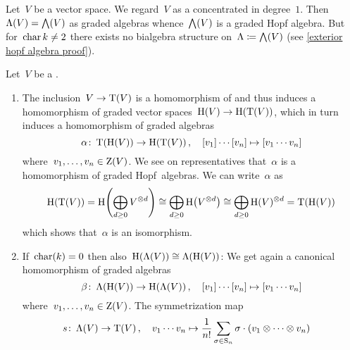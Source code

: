 \documentclass[a4paper,10pt,headings=standardclasses]{scrartcl}
\begin{document}
\begin{example}
  \label{exterior hopf algebra}
  Let~$V$ be a vector space.
  We regard~$V$ as a {\dgv} concentrated in degree~$1$.
  Then~$\operatorname{\Lambda}(V) = \bigwedge(V)$ as graded algebras whence~$\bigwedge(V)$ is a graded Hopf algebra.
  But for~$\operatorname{char} k \neq 2$ there exists no bialgebra structure on~$\Lambda \coloneqq \bigwedge(V)$ (see \cref{exterior hopf algebra proof}).
\end{example}

\begin{example}
  \label{homology of tensor and symmetric}
  Let~$V$ be a {\dgv}.
  \begin{enumerate}
    \item
      The inclusion~$V \to \operatorname{T}(V)$ is a homomorphism of {\dgvs} and thus induces a homomorphism of graded vector spaces~$\operatorname{H}(V) \to \operatorname{H}(\operatorname{T}(V))$, which in turn induces a homomorphism of graded algebras
      \[
        \alpha
        \colon
        \operatorname{T}(\operatorname{H}(V))
        \to
        \operatorname{H}(\operatorname{T}(V)) \,,
        \quad
        [v_1] \dotsm [v_n]
        \mapsto
        [v_1 \dotsm v_n]
      \]
      where~$v_1, \dotsc, v_n \in \operatorname{Z}(V)$.
      We see on representatives that~$\alpha$ is a homomorphism of graded Hopf~algebras.
      We can write~$\alpha$ as
      \[
        \operatorname{H}(\operatorname{T}(V))
        =
        \operatorname{H}\Biggl( \bigoplus_{d \geq 0} V^{\otimes d} \Biggr)
        \cong
        \bigoplus_{d \geq 0} \operatorname{H}\bigl( V^{\otimes d} \bigr)
        \cong
        \bigoplus_{d \geq 0} \operatorname{H}(V)^{\otimes d}
        =
        \operatorname{T}(\operatorname{H}(V))
      \]
      which shows that~$\alpha$ is an isomorphism.
    \item
      If~$\operatorname{char}(k) = 0$ then also~$\operatorname{H}(\operatorname{\Lambda}(V)) \cong \operatorname{\Lambda}(\operatorname{H}(V))$:
      We get again a canonical homomorphism of graded algebras
      \[
        \beta
        \colon
        \operatorname{\Lambda}(\operatorname{H}(V))
        \to
        \operatorname{H}(\operatorname{\Lambda}(V)) \,,
        \quad
        [v_1] \dotsm [v_n]
        \mapsto
        [v_1 \dotsm v_n]
      \]
      where~$v_1, \dotsc, v_n \in \operatorname{Z}(V)$.
      The symmetrization map
      \begin{align*}
        s
        \colon
        \dgSymm(V)
        \to
        \dgTensor(V) \,,
        \quad
        v_1 \dotsm v_n
        &\mapsto
        \frac{1}{n!} \sum_{\sigma \in \symm_n}
        \sigma \cdot (v_1 \tensor \dotsb \tensor v_n)

\end{align*}
\end{enumerate}
\end{example}
\end{document}
